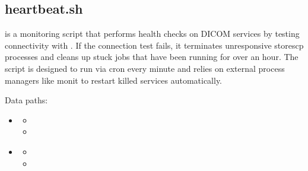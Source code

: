 \documentclass[letterpaper,10pt,english]{sphinxmanual}
\begin{document}
\sphinxstepscope


\subsection{heartbeat.sh}
\label{\detokenize{Architecture/scripts/heartbeat:heartbeat-sh}}\label{\detokenize{Architecture/scripts/heartbeat::doc}}
\sphinxAtStartPar
{} is a monitoring script that performs health checks on DICOM  services by testing connectivity with . If the connection test fails, it terminates unresponsive storescp processes and cleans up stuck  jobs that have been running for over an hour. The script is designed to run via cron every minute and relies on external process managers like monit to restart killed services automatically.

\sphinxAtStartPar
{}


\sphinxAtStartPar
{}


\sphinxAtStartPar
Data paths:
\begin{itemize}
\item {} \begin{description}
\begin{itemize}
\item {} 
\sphinxAtStartPar
{}

\item {} 
\sphinxAtStartPar
{}

\end{itemize}

\end{description}

\item {} \begin{description}
\begin{itemize}
\item {} 
\sphinxAtStartPar
{}

\item {} 
\sphinxAtStartPar
{}

\end{itemize}

\end{description}

\end{itemize}
\end{document}
